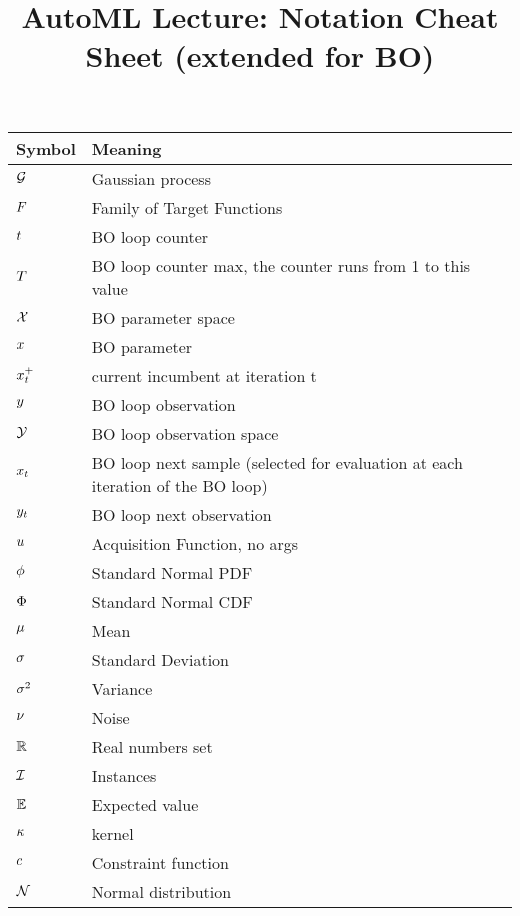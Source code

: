 \documentclass[]{report}
\title{AutoML Lecture: Notation Cheat Sheet (extended for BO)}
\author{}
\date{}
\begin{document}
\maketitle

\begin{table}
	\begin{tabular}{ll}
		\toprule
		Symbol & Meaning \\
		\midrule
        $\mathcal{G}$ & Gaussian process \\
        $F$ & Family of Target Functions \\
        $t$ & BO loop counter \\
        $T$ & BO loop counter max, the counter runs from 1 to this value \\
        $\mathcal{X}$ & BO parameter space \\
        $x$ & BO parameter \\
        $x^+_t$ & current incumbent at iteration t\\
        $y$ & BO loop observation \\
        $\mathcal{Y}$ & BO loop observation space \\
        $x_t$ & BO loop next sample (selected for evaluation at each iteration of the BO loop) \\
        $y_t$ & BO loop next observation \\
        $u$ & Acquisition Function, no args \\
        $\phi$ & Standard Normal PDF \\
        $\Phi$ & Standard Normal CDF \\
        $\mu$ & Mean \\
        $\sigma$ & Standard Deviation \\
        $\sigma^2$ & Variance \\
        $\nu$ & Noise \\
        $\mathbb{R}$ & Real numbers set \\
        $\mathcal{I}$ & Instances \\
        $\mathbb{E}$ & Expected value \\
        $\kappa$ & kernel \\
        $c$ & Constraint function \\
        $\mathcal{N}$ & Normal distribution \\
		\bottomrule
	\end{tabular}
\end{table}
\end{document}
